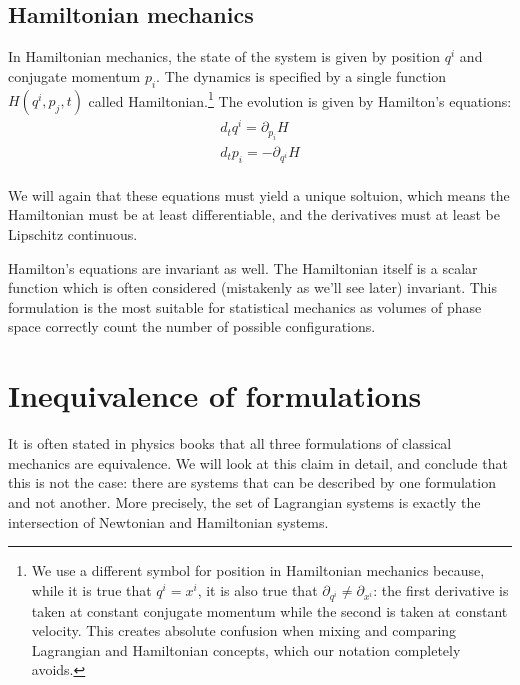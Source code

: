 \subsection{Hamiltonian mechanics}

In Hamiltonian mechanics, the state of the system is given by position $q^i$ and conjugate momentum $p_i$. The dynamics is specified by a single function $H(q^i, p_j, t)$ called Hamiltonian.\footnote{We use a different symbol for position in Hamiltonian mechanics because, while it is true that $q^i = x^i$, it is also true that $\partial_{q^i} \neq \partial_{x^i}$: the first derivative is taken at constant conjugate momentum while the second is taken at constant velocity. This creates absolute confusion when mixing and comparing Lagrangian and Hamiltonian concepts, which our notation completely avoids.} The evolution is given by Hamilton's equations:
\begin{equation}\label{rp-cm-HamiltonEq}
	\begin{aligned}
		d_t q^i = \partial_{p_i} H \\
		d_t p_i = - \partial_{q^i} H \\
	\end{aligned}
\end{equation}

We will again that these equations must yield a unique soltuion, which means the Hamiltonian must be at least differentiable, and the derivatives must at least be Lipschitz continuous.

Hamilton's equations are invariant as well. The Hamiltonian itself is a scalar function which is often considered (mistakenly as we'll see later) invariant. This formulation is the most suitable for statistical mechanics as volumes of phase space correctly count the number of possible configurations.

\section{Inequivalence of formulations}

It is often stated in physics books that all three formulations of classical mechanics are equivalence. We will look at this claim in detail, and conclude that this is not the case: there are systems that can be described by one formulation and not another. More precisely, the set of Lagrangian systems is exactly the intersection of Newtonian and Hamiltonian systems.

